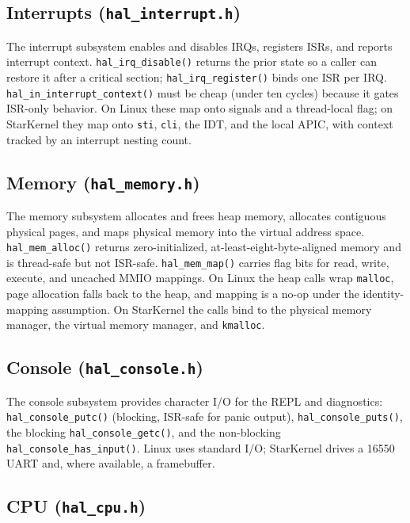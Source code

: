 \subsection{Interrupts (\texttt{hal\_interrupt.h})}

The interrupt subsystem enables and disables IRQs, registers ISRs, and reports
interrupt context. \texttt{hal\_irq\_disable()} returns the prior state so a
caller can restore it after a critical section; \texttt{hal\_irq\_register()}
binds one ISR per IRQ. \texttt{hal\_in\_interrupt\_context()} must be cheap
(under ten cycles) because it gates ISR-only behavior. On Linux these map onto
signals and a thread-local flag; on StarKernel they map onto \texttt{sti},
\texttt{cli}, the IDT, and the local APIC, with context tracked by an interrupt
nesting count.

\subsection{Memory (\texttt{hal\_memory.h})}

The memory subsystem allocates and frees heap memory, allocates contiguous
physical pages, and maps physical memory into the virtual address space.
\texttt{hal\_mem\_alloc()} returns zero-initialized, at-least-eight-byte-aligned
memory and is thread-safe but not ISR-safe. \texttt{hal\_mem\_map()} carries flag
bits for read, write, execute, and uncached MMIO mappings. On Linux the heap
calls wrap \texttt{malloc}, page allocation falls back to the heap, and mapping
is a no-op under the identity-mapping assumption. On StarKernel the calls bind to
the physical memory manager, the virtual memory manager, and \texttt{kmalloc}.

\subsection{Console (\texttt{hal\_console.h})}

The console subsystem provides character I/O for the REPL and diagnostics:
\texttt{hal\_console\_putc()} (blocking, ISR-safe for panic output),
\texttt{hal\_console\_puts()}, the blocking \texttt{hal\_console\_getc()}, and
the non-blocking \texttt{hal\_console\_has\_input()}. Linux uses standard I/O;
StarKernel drives a 16550 UART and, where available, a framebuffer.

\subsection{CPU (\texttt{hal\_cpu.h})}

